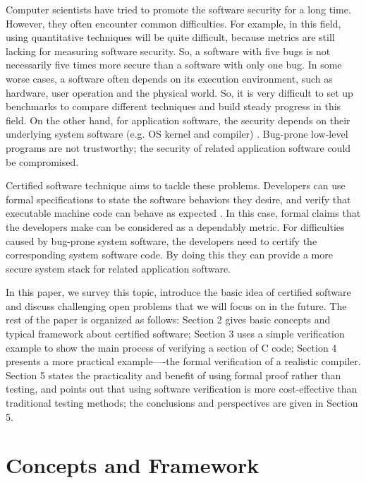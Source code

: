 \documentclass[10pt, conference, compsocconf]{IEEEtran}
\begin{document}
Computer scientists have tried to promote the software security for a long time. However, they often encounter common difficulties. For example, in this field, using quantitative techniques will be quite difficult, because metrics are still lacking for measuring software security. So, a software with five bugs is not necessarily five times more secure than a software with only one bug. In some worse cases, a software often depends on its execution environment, such as hardware, user operation and the physical world. So, it is very difficult to set up benchmarks to compare different techniques and build steady progress in this field. On the other hand, for application software, the security depends on their underlying system software (e.g. OS kernel and compiler) \cite{shao}. Bug-prone low-level programs are not trustworthy; the security of related application software could be compromised.

Certified software technique aims to tackle these problems. Developers can use formal specifications to state the software behaviors they desire, and verify that executable machine code can behave as expected \cite{shao}. In this case, formal claims that the developers make can be considered as a dependably metric. For difficulties caused by bug-prone system software, the developers need to certify the corresponding system software code. By doing this they can provide a more secure system stack for related application software.


In this paper, we survey this topic, introduce the basic idea of certified software and discuss challenging open problems that we will focus on in the future. The rest of the paper is organized as follows: Section 2 gives basic concepts and typical framework about certified software; Section 3 uses a simple verification example to show the main process of verifying a section of C code; Section 4 presents a more practical example----the formal verification of a realistic compiler. Section 5 states the practicality and benefit of using formal proof rather than testing, and points out that using software verification is more cost-effective than traditional testing methods; the conclusions and perspectives are given in Section 5.
 


\section{Concepts and Framework}
\end{document}
